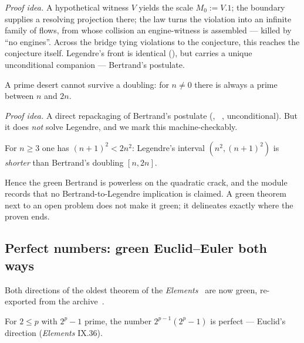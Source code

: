 \emph{Proof idea.} A hypothetical witness $V$ yields the scale $M_0:=V.1$; the boundary supplies
a resolving projection there; the law turns the violation into an infinite family of flows, from
whose collision an engine-witness is assembled --- killed by ``no engines''. Across the bridge
tying violations to the conjecture, this reaches the conjecture itself. Legendre's front
is identical (\green{}), but carries a unique unconditional companion --- Bertrand's postulate.

\begin{theorem}\label{thm:no_desert_doubles}
\green{}\; A prime desert cannot survive a doubling: for $n\neq0$ there is always a prime
between $n$ and $2n$. 
\end{theorem}

\emph{Proof idea.} A direct repackaging of Bertrand's postulate
(, ~\cite{mathlib}, unconditional).
But it does \emph{not} solve Legendre, and we mark this machine-checkably.

\begin{theorem}\label{thm:legendre_interval_shorter_than_bertrand}
\green{}\; For $n\ge3$ one has $(n+1)^2<2n^2$: Legendre's interval $(n^2,(n+1)^2)$ is
\emph{shorter} than Bertrand's doubling $[n,2n]$.
\end{theorem}

Hence the green Bertrand is powerless on the quadratic crack, and the module records that no
Bertrand-to-Legendre implication is claimed. A green theorem next to an open problem
does not make it green; it delineates exactly where the proven ends.

\subsection{Perfect numbers: green Euclid--Euler both ways}

Both directions of the oldest theorem of the \emph{Elements}~\cite{euclid-elements} are now green,
re-exported from the  archive~\cite{mathlib,wiedijk100}.

\begin{theorem}\label{thm:perfect_of_mersennePrime}
\green{}\; For $2\le p$ with $2^p-1$ prime, the number $2^{p-1}(2^p-1)$ is perfect --- Euclid's
direction (\emph{Elements} IX.36). 
\end{theorem}

